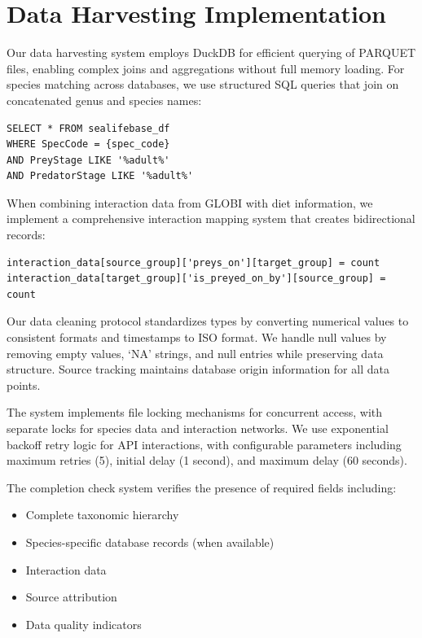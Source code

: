 \setcounter{page}{1}
\renewcommand{\thepage}{S\arabic{page}}

\section{Data Harvesting Implementation}\label{supp:data_harvesting}

Our data harvesting system employs DuckDB for efficient querying of PARQUET files, enabling complex joins and aggregations without full memory loading. For species matching across databases, we use structured SQL queries that join on concatenated genus and species names:

\begin{verbatim}
SELECT * FROM sealifebase_df
WHERE SpecCode = {spec_code}
AND PreyStage LIKE '%adult%'
AND PredatorStage LIKE '%adult%'
\end{verbatim}

When combining interaction data from GLOBI with diet information, we implement a comprehensive interaction mapping system that creates bidirectional records:

\begin{verbatim}
interaction_data[source_group]['preys_on'][target_group] = count
interaction_data[target_group]['is_preyed_on_by'][source_group] = count
\end{verbatim}

Our data cleaning protocol standardizes types by converting numerical values to consistent formats and timestamps to ISO format. We handle null values by removing empty values, `NA' strings, and null entries while preserving data structure. Source tracking maintains database origin information for all data points.

The system implements file locking mechanisms for concurrent access, with separate locks for species data and interaction networks. We use exponential backoff retry logic for API interactions, with configurable parameters including maximum retries (5), initial delay (1 second), and maximum delay (60 seconds).

The completion check system verifies the presence of required fields including:
\begin{itemize}
\item Complete taxonomic hierarchy
\item Species-specific database records (when available)
\item Interaction data
\item Source attribution
\item Data quality indicators
\end{itemize}

